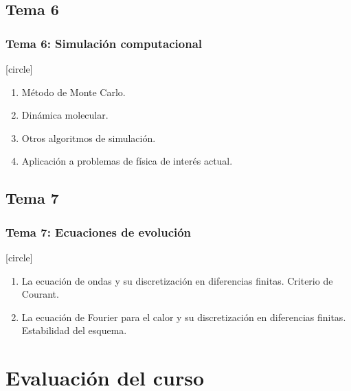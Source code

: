 \documentclass[12pt]{beamer}
\begin{document}
\subsection*{Tema 6}
\begin{frame}
\frametitle{\textbf{Tema 6: Simulación computacional}}
[circle]
\begin{enumerate}[<+->]
\item Método de Monte Carlo.
\item Dinámica molecular.
\item Otros algoritmos de simulación.
\item Aplicación a problemas de física de interés actual.
\end{enumerate}
\end{frame}
\subsection*{Tema 7}
\begin{frame}
\frametitle{\textbf{Tema 7: Ecuaciones de evolución}}
[circle]
\begin{enumerate}[<+->]
\item La ecuación de ondas y su discretización en diferencias finitas. Criterio de Courant.
\item La ecuación de Fourier para el calor y su discretización en diferencias finitas. Estabilidad del esquema.
\end{enumerate}
\end{frame}
\section{Evaluación del curso}
\end{document}
